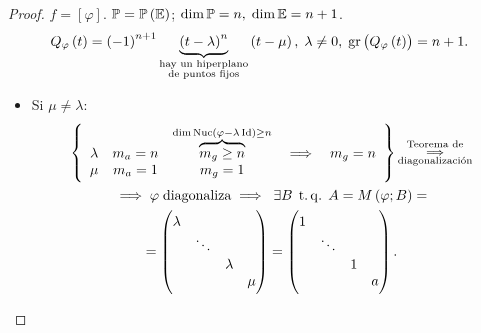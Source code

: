 \begin{proof}
    $f=\left[ \varphi \right]$. $\mathbb{P} = \mathbb{P} \left( \mathbb{E} \right)$; $\dim \mathbb{P} = n, \; \dim \mathbb{E} = n+1$.
    \[
        Q_{\varphi} \left( t \right) = \left( -1 \right) ^{n+1} \underbrace{\left( t-\lambda \right) ^{n}}_{\substack{\text{hay un hiperplano}\\ \text{de puntos fijos}}} \left( t-\mu \right), \; \lambda \neq 0, \; \operatorname{gr} \left( Q_{\varphi} \left( t \right) \right) = n+1.
    \]
    \begin{itemize}
        \item Si $\mu \neq \lambda$:
            \begin{gather*}
                \left\{
                \begin{array}{ccccc}
                    \lambda & m_a=n & \overbrace{m_g \geq n}^{\dim \operatorname{Nuc} \left( \varphi - \lambda \operatorname{Id} \right) \geq n} & \implies & m_g=n \\
                    \mu & m_a=1 & m_g = 1 & &  
                \end{array} \right\} \substack{\text{Teorema de} \\ \implies \\ \text{diagonalización}} \\
                \implies \varphi \; \text{diagonaliza} \implies \; \exists B \operatorname{\;t.q.\;} A=M \left( \varphi ; B \right) = \\
                = \begin{pmatrix}
                    \lambda & & & \\
                    & \ddots & & \\
                    & & \lambda & \\
                    & & & \mu
                \end{pmatrix} = \begin{pmatrix}
                    1 & & & \\
                    & \ddots & & \\
                    & & 1 & \\
                    & & & a
                \end{pmatrix}.
            \end{gather*}
    \end{itemize}
\end{proof}


